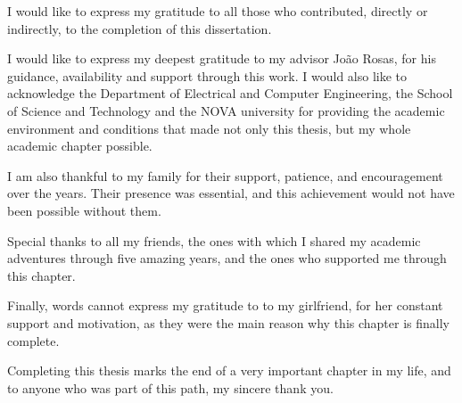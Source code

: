 
%

\begin{ntacknowledgements}
I would like to express my gratitude to all those who contributed, directly or indirectly, to the completion of this dissertation.

I would like to express my deepest gratitude to my advisor João Rosas, for his guidance, availability and support through this work. 
I would also like to acknowledge the Department of Electrical and Computer Engineering, the School of Science and Technology and the NOVA university for providing the academic environment and conditions that made not only this thesis, but my whole academic chapter possible.

I am also thankful to my family for their support, patience, and encouragement over the years. Their presence was essential, and this achievement would not have been possible without them.

Special thanks to all my friends, the ones with which I shared my academic adventures through five amazing years, and the ones who supported me through this chapter.

Finally, words cannot express my gratitude to to my girlfriend, for her constant support and motivation, as they were the main reason why this chapter is finally complete. 

Completing this thesis marks the end of a very important chapter in my life, and to anyone who was part of this path, my sincere thank you.

\end{ntacknowledgements}